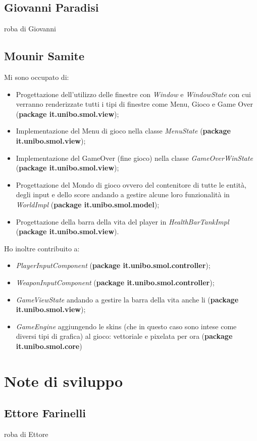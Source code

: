 \documentclass[a4paper,12pt]{report}
\begin{document}
\subsection*{Giovanni Paradisi}
roba di Giovanni
\subsection*{Mounir Samite}
Mi sono occupato di:
\begin{itemize}
    \item Progettazione dell'utilizzo delle finestre con \emph{Window} e \emph{WindowState} con cui verranno renderizzate tutti i tipi di finestre come Menu, Gioco e Game Over (\textbf{package it.unibo.smol.view});
    \item Implementazione del Menu di gioco nella classe \emph{MenuState} (\textbf{package it.unibo.smol.view});
    \item Implementazione del GameOver (fine gioco) nella classe \emph{GameOverWinState} (\textbf{package it.unibo.smol.view});
    \item Progettazione del Mondo di gioco ovvero del contenitore di tutte le entità, degli input e dello score andando a gestire alcune loro funzionalità in \emph{WorldImpl} (\textbf{package it.unibo.smol.model});
    \item Progettazione della barra della vita del player in \emph{HealthBarTankImpl} (\textbf{package it.unibo.smol.view}).
\end{itemize}
Ho inoltre contribuito a:
\begin{itemize}
    \item \emph{PlayerInputComponent} (\textbf{package it.unibo.smol.controller});
    \item \emph{WeaponInputComponent} (\textbf{package it.unibo.smol.controller});
    \item \emph{GameViewState} andando a gestire la barra della vita anche li (\textbf{package it.unibo.smol.view});
    \item \emph{GameEngine} aggiungendo le skins (che in questo caso sono intese come diversi tipi di grafica) al gioco: vettoriale e pixelata per ora (\textbf{package it.unibo.smol.core}) 
\end{itemize}

\section{Note di sviluppo}

\subsection*{Ettore Farinelli}
roba di Ettore
\end{document}
